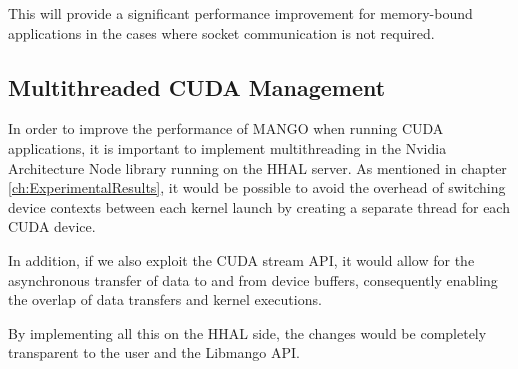 This will provide a significant performance improvement for memory-bound applications in the cases where socket communication is not required.

\subsection{Multithreaded CUDA Management}

In order to improve the performance of MANGO when running CUDA applications, it is important to implement multithreading in the Nvidia Architecture Node library running on the HHAL server. As mentioned in chapter \ref{ch:ExperimentalResults}, it would be possible to avoid the overhead of switching device contexts between each kernel launch by creating a separate thread for each CUDA device. 

In addition, if we also exploit the CUDA stream API, it would allow for the asynchronous transfer of data to and from device buffers, consequently enabling the overlap of data transfers and kernel executions. 

By implementing all this on the HHAL side, the changes would be completely transparent to the user and the Libmango API.
